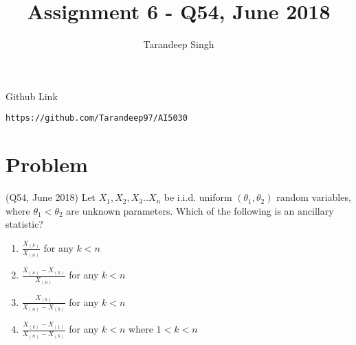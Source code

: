 \documentclass[journal,12pt,twocolumn]{IEEEtran}
\begin{document}
     \def\rightbox#1{\makebox[0in][r]{#1}}
     \def\centbox#1{\makebox[0in]{#1}}
     \def\topbox#1{\raisebox{-\baselineskip}[0in][0in]{#1}}
     \def\midbox#1{\raisebox{-0.5\baselineskip}[0in][0in]{#1}}
\vspace{3cm}
\title{Assignment 6 - Q54, June 2018}
\author{Tarandeep Singh}
\maketitle
\newpage
\bigskip
\renewcommand{\thefigure}{\theenumi}
\renewcommand{\thetable}{\theenumi}
Github Link
\begin{lstlisting}
https://github.com/Tarandeep97/AI5030
\end{lstlisting}
\section{Problem}
(Q54, June 2018) Let $X_{1},X_{2},X_{3}..X_{n}$ be i.i.d. uniform $(\theta_{1},\theta_{2})$ random variables, where $\theta_{1}<\theta_{2}$ are unknown parameters. Which of the following is an ancillary statistic?
\begin{enumerate}
\item $\frac{X_{(k)}}{X_{(n)}}$ for any $k<n$
\item $\frac{X_{(n)}-X_{(k)}}{X_{(n)}}$ for any $k<n$
\item $\frac{X_{(k)}}{X_{(n)}-X_{(k)}}$ for any $k<n$
\item $\frac{X_{(k)}-X_{(1)}}{X_{(n)}-X_{(k)}}$ for any $k<n$ where $1<k<n$
\end{enumerate}
\end{document}
